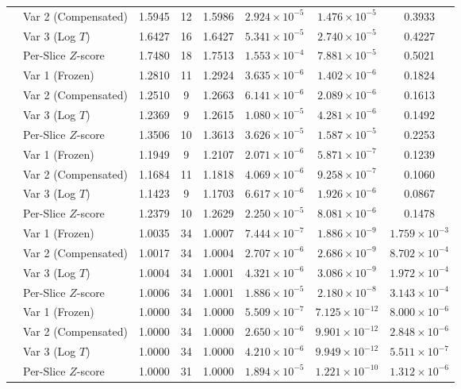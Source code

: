 \documentclass[11pt,a4paper]{article}
\begin{document}
\begin{table}[htbp]
{\begin{tabular}{llcccccc}
      & Var 2 (Compensated) & 1.5945 & 12 & 1.5986 & $2.924 \times 10^{-5}$ & $1.476 \times 10^{-5}$ & 0.3933 \\
      & Var 3 (Log $T$)     & 1.6427 & 16 & 1.6427 & $5.341 \times 10^{-5}$ & $2.740 \times 10^{-5}$ & 0.4227 \\
      & Per-Slice $Z$-score & 1.7480 & 18 & 1.7513 & $1.553 \times 10^{-4}$ & $7.881 \times 10^{-5}$ & 0.5021 \\
\addlinespace
0.850 & Var 1 (Frozen)      & 1.2810 & 11 & 1.2924 & $3.635 \times 10^{-6}$ & $1.402 \times 10^{-6}$ & 0.1824 \\
      & Var 2 (Compensated) & 1.2510 &  9 & 1.2663 & $6.141 \times 10^{-6}$ & $2.089 \times 10^{-6}$ & 0.1613 \\
      & Var 3 (Log $T$)     & 1.2369 &  9 & 1.2615 & $1.080 \times 10^{-5}$ & $4.281 \times 10^{-6}$ & 0.1492 \\
      & Per-Slice $Z$-score & 1.3506 & 10 & 1.3613 & $3.626 \times 10^{-5}$ & $1.587 \times 10^{-5}$ & 0.2253 \\
\addlinespace
1.000 & Var 1 (Frozen)      & 1.1949 &  9 & 1.2107 & $2.071 \times 10^{-6}$ & $5.871 \times 10^{-7}$ & 0.1239 \\
      & Var 2 (Compensated) & 1.1684 & 11 & 1.1818 & $4.069 \times 10^{-6}$ & $9.258 \times 10^{-7}$ & 0.1060 \\
      & Var 3 (Log $T$)     & 1.1423 &  9 & 1.1703 & $6.617 \times 10^{-6}$ & $1.926 \times 10^{-6}$ & 0.0867 \\
      & Per-Slice $Z$-score & 1.2379 & 10 & 1.2629 & $2.250 \times 10^{-5}$ & $8.081 \times 10^{-6}$ & 0.1478 \\
\addlinespace
2.000 & Var 1 (Frozen)      & 1.0035 & 34 & 1.0007 & $7.444 \times 10^{-7}$ & $1.886 \times 10^{-9}$ & $1.759 \times 10^{-3}$ \\
      & Var 2 (Compensated) & 1.0017 & 34 & 1.0004 & $2.707 \times 10^{-6}$ & $2.686 \times 10^{-9}$ & $8.702 \times 10^{-4}$ \\
      & Var 3 (Log $T$)     & 1.0004 & 34 & 1.0001 & $4.321 \times 10^{-6}$ & $3.086 \times 10^{-9}$ & $1.972 \times 10^{-4}$ \\
      & Per-Slice $Z$-score & 1.0006 & 34 & 1.0001 & $1.886 \times 10^{-5}$ & $2.180 \times 10^{-8}$ & $3.143 \times 10^{-4}$ \\
\addlinespace
3.000 & Var 1 (Frozen)      & 1.0000 & 34 & 1.0000 & $5.509 \times 10^{-7}$ & $7.125 \times 10^{-12}$ & $8.000 \times 10^{-6}$ \\
      & Var 2 (Compensated) & 1.0000 & 34 & 1.0000 & $2.650 \times 10^{-6}$ & $9.901 \times 10^{-12}$ & $2.848 \times 10^{-6}$ \\
      & Var 3 (Log $T$)     & 1.0000 & 34 & 1.0000 & $4.210 \times 10^{-6}$ & $9.949 \times 10^{-12}$ & $5.511 \times 10^{-7}$ \\
      & Per-Slice $Z$-score & 1.0000 & 31 & 1.0000 & $1.894 \times 10^{-5}$ & $1.221 \times 10^{-10}$ & $1.312 \times 10^{-6}$ \\
\bottomrule
\end{tabular}%
}
\end{table}
\end{document}
